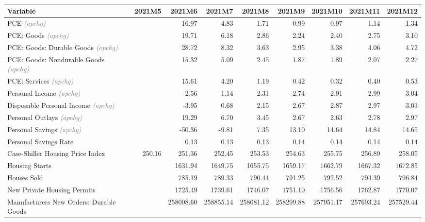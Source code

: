 \documentclass[11pt, letterpaper]{article}\usepackage[]{graphicx}\usepackage[]{color}
\begin{document}
\begin{table}[H]
\centering
\begingroup\fontsize{10pt}{12pt}\selectfont
\begin{tabular}{lrrrrrrrr}
  \hline
Variable & 2021M5 & 2021M6 & 2021M7 & 2021M8 & 2021M9 & 2021M10 & 2021M11 & 2021M12 \\ 
  \hline
PCE \textit{\footnotesize\textcolor{gray}{(apchg)}} &  & 16.97 & 4.83 & 1.71 & 0.99 & 0.97 & 1.14 & 1.34 \\ 
  PCE: Goods \textit{\footnotesize\textcolor{gray}{(apchg)}} &  & 19.71 & 6.18 & 2.86 & 2.24 & 2.40 & 2.75 & 3.10 \\ 
  PCE: Goods: Durable Goods \textit{\footnotesize\textcolor{gray}{(apchg)}} &  & 28.72 & 8.32 & 3.63 & 2.95 & 3.38 & 4.06 & 4.72 \\ 
  PCE: Goods: Nondurable Goods \textit{\footnotesize\textcolor{gray}{(apchg)}} &  & 15.32 & 5.09 & 2.45 & 1.87 & 1.89 & 2.07 & 2.27 \\ 
  PCE: Services \textit{\footnotesize\textcolor{gray}{(apchg)}} &  & 15.61 & 4.20 & 1.19 & 0.42 & 0.32 & 0.40 & 0.53 \\ 
  Personal Income \textit{\footnotesize\textcolor{gray}{(apchg)}} &  & -2.56 & 1.14 & 2.31 & 2.74 & 2.91 & 2.99 & 3.04 \\ 
  Disposable Personal Income \textit{\footnotesize\textcolor{gray}{(apchg)}} &  & -3.95 & 0.68 & 2.15 & 2.67 & 2.87 & 2.97 & 3.03 \\ 
  Personal Outlays \textit{\footnotesize\textcolor{gray}{(apchg)}} &  & 19.29 & 6.70 & 3.45 & 2.67 & 2.63 & 2.78 & 2.97 \\ 
  Personal Savings \textit{\footnotesize\textcolor{gray}{(apchg)}} &  & -50.36 & -9.81 & 7.35 & 13.10 & 14.64 & 14.84 & 14.65 \\ 
  Personal Savings Rate &  & 0.13 & 0.13 & 0.13 & 0.14 & 0.14 & 0.14 & 0.14 \\ 
  Case-Shiller Housing Price Index & 250.16 & 251.36 & 252.45 & 253.53 & 254.63 & 255.75 & 256.89 & 258.05 \\ 
  Housing Starts &  & 1631.94 & 1649.75 & 1655.75 & 1659.17 & 1662.79 & 1667.32 & 1672.85 \\ 
  Houses Sold &  & 785.19 & 789.33 & 790.44 & 791.25 & 792.52 & 794.39 & 796.84 \\ 
  New Private Housing Permits &  & 1725.49 & 1739.61 & 1746.07 & 1751.10 & 1756.56 & 1762.87 & 1770.07 \\ 
  Manufacturers New Orders: Durable Goods &  & 258008.60 & 258855.14 & 258681.12 & 258299.88 & 257951.17 & 257693.24 & 257529.44 \\ 

\end{tabular}
\end{table}
\end{document}
